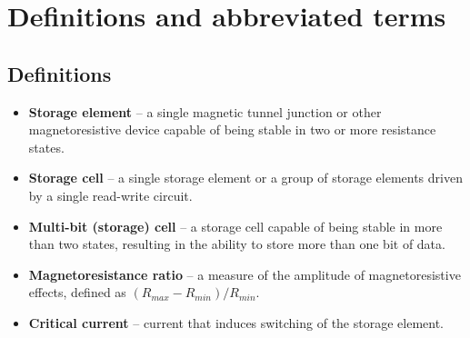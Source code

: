 \chapter{Definitions and abbreviated terms}

\section{Definitions}
\begin{itemize}
    \item \textbf{Storage element} -- a single magnetic tunnel junction or other magnetoresistive device capable of being stable in two or more resistance states.
    \item \textbf{Storage cell} -- a single storage element or a group of storage elements driven by a single read-write circuit.
    \item \textbf{Multi-bit (storage) cell} -- a storage cell capable of being stable in more than two states, resulting in the ability to store more than one bit of data.
    \item \textbf{Magnetoresistance ratio} -- a measure of the amplitude of magnetoresistive effects, defined as $(R_{max}-R_{min})/R_{min}$.
    \item \textbf{Critical current} -- current that induces switching of the storage element.


\end{itemize}

